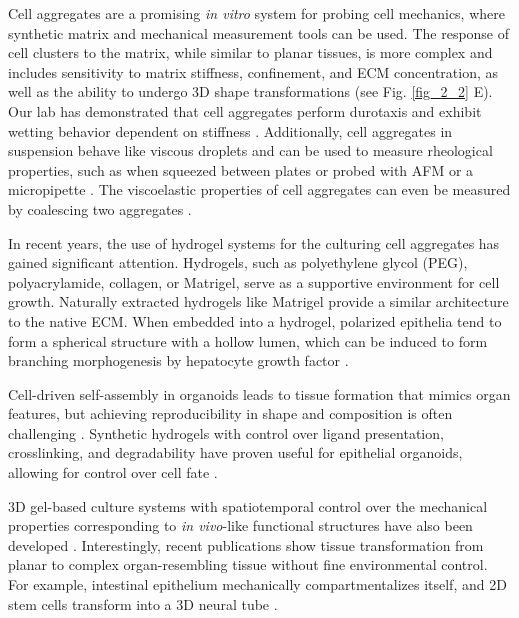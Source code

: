 Cell aggregates are a promising \textit{in vitro} system for probing cell mechanics, where synthetic matrix and mechanical measurement tools can be used. The response of cell clusters to the matrix, while similar to planar tissues, is more complex and includes sensitivity to matrix stiffness, confinement, and ECM concentration, as well as the ability to undergo 3D shape transformations (see Fig. \ref{fig_2_2} E). Our lab has demonstrated that cell aggregates perform durotaxis and exhibit wetting behavior dependent on stiffness \cite{perez-gonzalez2019, pallares2022}. Additionally, cell aggregates in suspension behave like viscous droplets and can be used to measure rheological properties, such as when squeezed between plates or probed with AFM or a micropipette \cite{xi2018}. The viscoelastic properties of cell aggregates can even be measured by coalescing two aggregates
\cite{oriola2022}.

In recent years, the use of hydrogel systems for the culturing cell aggregates has gained significant attention. Hydrogels, such as polyethylene glycol (PEG), polyacrylamide, collagen, or Matrigel, serve as a supportive environment for cell growth. Naturally extracted hydrogels like Matrigel provide a similar architecture to the native ECM. When embedded into a hydrogel, polarized epithelia tend to form a spherical structure with a hollow lumen, which can be induced to form branching morphogenesis by hepatocyte growth factor \cite{bryant2008}. 

Cell-driven self-assembly in organoids leads to tissue formation that mimics organ features, but achieving reproducibility in shape and composition is often challenging \cite{nelson2008, hofer2021}. Synthetic hydrogels with control over ligand presentation, crosslinking, and degradability have proven useful for epithelial organoids, allowing for control over cell fate \cite{gjorevski2016, gjorevski2022}.

3D gel-based culture systems with spatiotemporal control over the mechanical properties corresponding to \textit{in vivo}-like functional structures have also been developed \cite{torras2018}. Interestingly, recent publications show tissue transformation from planar to complex organ-resembling tissue without fine environmental control. For example, intestinal epithelium mechanically compartmentalizes itself, and 2D stem cells transform into a 3D neural tube \cite{perez-gonzalez2021, karzbrun2021}.

